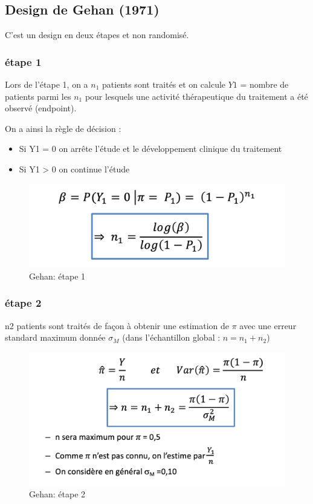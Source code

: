 \subsection{Design de Gehan (1971)}
C'est un design en deux étapes et non randomisé. 

\subsubsection{étape 1}

Lors de l'étape 1, on a $n_{1}$ patients sont traités et on calcule $Y{1}$ = nombre de patients parmi les $n_{1}$ pour lesquels une activité thérapeutique du traitement a été observé (endpoint). 

On a ainsi la règle de décision :
\begin{itemize}
    \item Si Y1 = 0 on arrête l’étude et le développement clinique du traitement
    \item Si Y1 > 0 on continue l’étude
\end{itemize}
\begin{figure}[H]
    \centering
    \includegraphics[scale = 0.3]{images/gehan1.png}
    \caption{Gehan: étape 1}
    \label{fig:gehan1}
\end{figure}

\subsubsection{étape 2}
n2 patients sont traités de façon à obtenir une estimation de $\pi$
avec une erreur standard maximum donnée $\sigma_{M}$ (dans
l’échantillon global : $n = n_1 + n_2$)

\begin{figure}[H]
    \centering
    \includegraphics[scale = 0.3]{images/gehan2.png}
    \caption{Gehan: étape 2}
    \label{fig:gehan2}
\end{figure}

